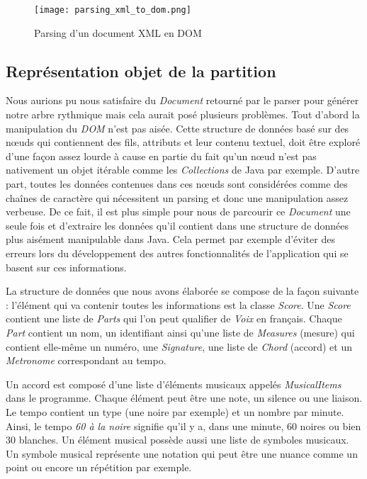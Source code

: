 \begin{figure}[!h]
\centering
\texttt{[image: parsing\_xml\_to\_dom.png]}\\[1cm]
\caption{Parsing d'un document XML en DOM}
\label{Parsing d'un document XML en DOM}
\end{figure}


\subsection{Représentation objet de la partition}

\par
Nous aurions pu nous satisfaire du \emph{Document} retourné par le parser pour
générer notre arbre rythmique mais cela aurait posé plusieurs problèmes. Tout d'abord
la manipulation du \emph{DOM} n'est pas aisée. Cette structure de données basé sur
des nœuds qui contiennent des fils, attributs et leur contenu textuel, doit
être exploré d'une façon assez lourde à cause en partie du fait qu'un nœud n'est
pas nativement un objet itérable comme les \emph{Collections} de Java par exemple.
D'autre part, toutes les données contenues dans ces nœuds sont considérées comme des chaînes
de caractère qui nécessitent un parsing et donc une manipulation assez verbeuse.
De ce fait, il est plus simple pour nous de parcourir ce \emph{Document} une seule fois et d'extraire les données qu'il
contient dans une structure de données plus aisément manipulable dans Java. Cela
permet par exemple d'éviter des erreurs lors du développement des autres fonctionnalités de
l'application qui se basent sur ces informations.


\par
La structure de données que nous avons élaborée se compose de la façon suivante :
l'élément qui va contenir toutes les informations est la classe \emph{Score}. Une
\emph{Score} contient une liste de \emph{Parts} qui l'on peut qualifier de
\emph{Voix} en français. Chaque \emph{Part} contient un nom, un identifiant ainsi qu'une liste
de \emph{Measures} (mesure) qui contient elle-même un numéro, une \emph{Signature}, une
liste de \emph{Chord} (accord) et un \emph{Metronome} correspondant au tempo.

\par
Un accord est composé d'une liste d'éléments musicaux appelés \emph{MusicalItems} dans le programme. 
Chaque élément peut être une note, un silence ou une liaison. Le tempo contient un type 
(une noire par exemple) et un nombre par minute. Ainsi, le tempo \emph{60 à la noire} signifie qu'il y a, 
dans une minute, 60 noires ou bien 30 blanches. Un élément musical possède aussi une liste de symboles
musicaux. Un symbole musical représente une notation qui peut être une nuance comme
un point ou encore un répétition par exemple.

